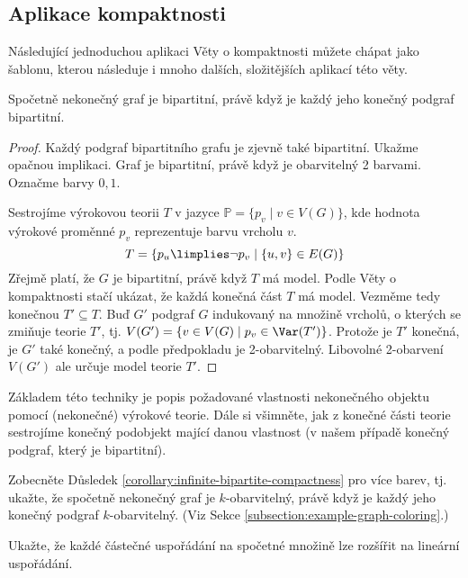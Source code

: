 
\subsection{Aplikace kompaktnosti}

Následující jednoduchou aplikaci Věty o kompaktnosti můžete chápat jako šablonu, kterou následuje i mnoho dalších, složitějších aplikací této věty. 

\begin{corollary}\label{corollary:infinite-bipartite-compactness}
Spočetně nekonečný graf je bipartitní, právě když je každý jeho konečný podgraf bipartitní.    
\end{corollary}

\begin{proof}
    Každý podgraf bipartitního grafu je zjevně také bipartitní. Ukažme opačnou implikaci. Graf je bipartitní, právě když je obarvitelný 2 barvami. Označme barvy $0,1$.

    Sestrojíme výrokovou teorii $T$ v jazyce $\mathbb P=\{p_v\mid v\in V(G)\}$, kde hodnota výrokové proměnné $p_v$ reprezentuje barvu vrcholu $v$.
    $$  
        T=\{p_u\limplies\neg p_v\mid \{u,v\}\in E(G)\}
    $$
    Zřejmě platí, že $G$ je bipartitní, právě když $T$ má model. Podle Věty o kompaktnosti stačí ukázat, že každá konečná část $T$ má model. Vezměme tedy konečnou $T'\subseteq T$. Buď $G'$ podgraf $G$ indukovaný na množině vrcholů, o kterých se zmiňuje teorie $T'$, tj. $V(G')=\{v\in V(G)\mid p_v\in\Var(T')\}$. Protože je $T'$ konečná, je $G'$ také konečný, a podle předpokladu je 2-obarvitelný. Libovolné 2-obarvení $V(G')$ ale určuje model teorie $T'$.
\end{proof}

Základem této techniky je popis požadované vlastnosti nekonečného objektu pomocí (nekonečné) výrokové teorie. Dále si všimněte, jak z konečné části teorie sestrojíme konečný podobjekt mající danou vlastnost (v našem případě konečný podgraf, který je bipartitní).

\begin{exercise}
    Zobecněte Důsledek \ref{corollary:infinite-bipartite-compactness} pro více barev, tj. ukažte, že spočetně nekonečný graf je $k$-obarvitelný, právě když je každý jeho konečný podgraf $k$-obarvitelný. (Viz Sekce \ref{subsection:example-graph-coloring}.)
\end{exercise}

\begin{exercise}
    Ukažte, že každé částečné uspořádání na spočetné množině lze rozšířit na lineární uspořádání.
\end{exercise}

